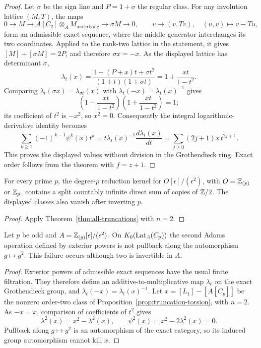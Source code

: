 \begin{proof}
Let $\sigma$ be the sign line and $P=1+\sigma$ the regular class.
For any involution lattice $(M,T)$, the maps
\[
 0\longrightarrow M\longrightarrow
 A[C_2]\otimes_A M_{\mathrm{underlying}}
 \longrightarrow\sigma M\longrightarrow0,
 \qquad
 v\longmapsto(v,Tv),\quad (u,v)\longmapsto v-Tu,
\]
form an admissible exact sequence, where the middle generator
interchanges its two coordinates.  Applied to the rank-two lattice
in the statement, it gives $[M]+[\sigma M]=2P$, and therefore
$\sigma x=-x$.
As the displayed lattice has determinant $\sigma$,
\[
 \lambda_t(x)=
 \frac{1+(P+x)t+\sigma t^2}{(1+t)(1+\sigma t)}
 =1+\frac{xt}{1-t^2}.
\]
Comparing $\lambda_t(\sigma x)=\lambda_{\sigma t}(x)$ with
$\lambda_t(-x)=\lambda_t(x)^{-1}$ gives
\[
 \left(1-\frac{xt}{1-t^2}\right)
 \left(1+\frac{xt}{1-t^2}\right)=1;
\]
its coefficient of $t^2$ is $-x^2$, so $x^2=0$.
Consequently the integral logarithmic-derivative identity becomes
\[
 \sum_{k\ge1}(-1)^{k-1}\psi^k(x)t^k
 =t\lambda_t(x)^{-1}\frac{d\lambda_t(x)}{dt}
 =\sum_{j\ge0}(2j+1)x\,t^{2j+1}.
\]
This proves the displayed values without division in the
Grothendieck ring.  Exact order follows from the theorem with
$f=z+1$.
\end{proof}

\begin{corollary}\label{cor:all-prime-two-torsion}
For every prime $p$, the degree-$p$ reduction kernel for
$O[\epsilon]/(\epsilon^2)$, with $O=\mathbb Z_{(p)}$ or $\mathbb Z_p$,
contains a split countably infinite direct sum of copies of $\mathbb Z/2$.
The displayed classes also vanish after inverting $p$.
\end{corollary}
\begin{proof}
Apply Theorem~\ref{thm:all-truncations} with $n=2$.
\end{proof}

\begin{corollary}\label{cor:adams-not-power}
Let $p$ be odd and $A=\mathbb Z_{(p)}[\epsilon]/(\epsilon^2)$.
On $K_0(\operatorname{Lat}_A(C_p))$ the second Adams operation defined by exterior
powers is not pullback along the automorphism $g\mapsto g^2$.
This failure occurs although two is invertible in $A$.
\end{corollary}

\begin{proof}
Exterior powers of admissible exact sequences have the usual finite
filtration.  They therefore define an additive-to-multiplicative map
$\lambda_t$ on the exact Grothendieck group, and
$\lambda_t(-x)=\lambda_t(x)^{-1}$.
Let $x=[L_1]-[A[C_p]]$ be the nonzero order-two class of
Proposition~\ref{prop:truncation-torsion}, with $n=2$.
As $-x=x$, comparison of coefficients of $t^2$ gives
\[
 \lambda^2(x)=x^2-\lambda^2(x),\qquad
 \psi^2(x)=x^2-2\lambda^2(x)=0.
\]
Pullback along $g\mapsto g^2$ is an automorphism of the exact category,
so its induced group automorphism cannot kill $x$.
\end{proof}

